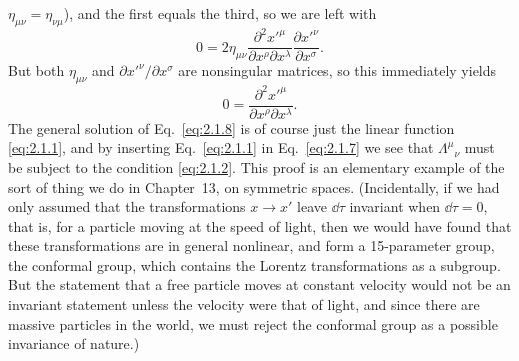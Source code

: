 \(\eta_{\mu\nu}=\eta_{\nu\mu}\)), and the first equals the third, so we are
left with
\[
  0=2\eta_{\mu\nu}
  \frac{\partial^2x'^\mu}{\partial x^\rho\partial x^\lambda}
  \frac{\partial x'^\nu}{\partial x^\sigma}.
\]
But both \(\eta_{\mu\nu}\) and
\(\partial x'^\nu/\partial x^\sigma\) are nonsingular matrices, so this
immediately yields
\begin{equation}
  0=\frac{\partial^2x'^\mu}
  {\partial x^\rho\partial x^\lambda}.
  \tag{2.1.8}\label{eq:2.1.8}
\end{equation}
The general solution of Eq.~\eqref{eq:2.1.8} is of course just the linear
function \eqref{eq:2.1.1}, and by inserting Eq.~\eqref{eq:2.1.1} in
Eq.~\eqref{eq:2.1.7} we see that \(\Lambda^\mu{}_\nu\) must be subject to the
condition \eqref{eq:2.1.2}. This proof is an elementary example of the sort of
thing we do in Chapter~13, on symmetric spaces. (Incidentally, if we had only
assumed that the transformations \(x\to x'\) leave \(\dd\tau\) invariant when
\(\dd\tau=0\), that is, for a particle moving at the speed of light, then we would
have found that these transformations are in general nonlinear, and form a
15-parameter group, the conformal group, which contains the Lorentz
transformations as a subgroup. But the statement that a free particle moves at
constant velocity would not be an invariant statement unless the velocity were
that of light, and since there are massive particles in the world, we must reject
the conformal group as a possible invariance of nature.)

